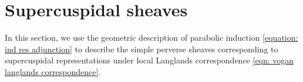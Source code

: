 \documentclass[11pt,letterpaper]{amsart}
\newcommand{\irrepdual}[1]{\widehat{#1}}
\newcommand{\pure}{\mathrm{pure}}
\newcommand{\Ind}{\mathrm{Ind}}
\newcommand{\stsh}[2]{{#1}_{#2}}
\renewcommand{\1}{\mathbbm{1}}
\numberwithin{equation}{section}
\begin{document}
{%



\section{Supercuspidal sheaves}\label{section: supercuspidal sheaves}
In this section, we use the geometric description of parabolic induction \eqref{equation: ind res adjunction} to 
describe the simple perverse sheaves corresponding to supercuspidal representations under local Langlands correspondence \eqref{eqn: vogan langlands correspondence}.


}
\end{document}
